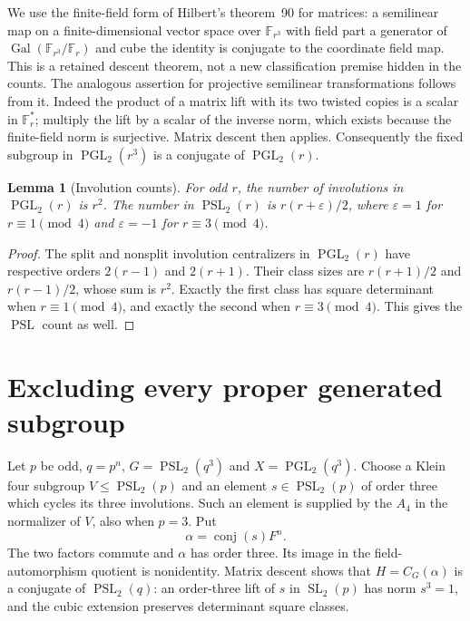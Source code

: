 \documentclass[11pt,a4paper]{article}
\newtheorem{lemma}{Lemma}
\newcommand{\PSL}{\operatorname{PSL}}
\newcommand{\PGL}{\operatorname{PGL}}
\begin{document}
We use the finite-field form of Hilbert's theorem~90 for matrices:
a semilinear map on a finite-dimensional vector space over
$\mathbb F_{r^3}$ with field part a generator of
$\operatorname{Gal}(\mathbb F_{r^3}/\mathbb F_r)$ and cube the
identity is conjugate to the coordinate field map. This is a retained
descent theorem, not a new classification premise hidden in the counts.
The analogous assertion for projective semilinear transformations follows
from it. Indeed the product of a matrix lift with its two twisted copies
is a scalar in $\mathbb F_r^*$; multiply the lift by a scalar of the
inverse norm, which exists because the finite-field norm is surjective.
Matrix descent then applies. Consequently the fixed subgroup in
$\PGL_2(r^3)$ is a conjugate of $\PGL_2(r)$.

\begin{lemma}[Involution counts]\label{counts}
For odd $r$, the number of involutions in $\PGL_2(r)$ is $r^2$.
The number in $\PSL_2(r)$ is $r(r+\varepsilon)/2$, where
$\varepsilon=1$ for $r\equiv1\pmod4$ and $\varepsilon=-1$
for $r\equiv3\pmod4$.
\end{lemma}
\begin{proof}
The split and nonsplit involution centralizers in $\PGL_2(r)$
have respective orders $2(r-1)$ and $2(r+1)$. Their class sizes
are $r(r+1)/2$ and $r(r-1)/2$, whose sum is $r^2$.
Exactly the first class has square determinant when $r\equiv1
\pmod4$, and exactly the second when $r\equiv3\pmod4$.
This gives the $\PSL$ count as well.
\end{proof}

\section{Excluding every proper generated subgroup}

Let $p$ be odd, $q=p^n$, $G=\PSL_2(q^3)$ and
$X=\PGL_2(q^3)$. Choose a Klein four subgroup
$V\leq\PSL_2(p)$ and an element $s\in\PSL_2(p)$ of order
three which cycles its three involutions. Such an element is supplied
by the $A_4$ in the normalizer of $V$, also when $p=3$.
Put
\[
                   \alpha=\operatorname{conj}(s)F^n.
\]
The two factors commute and $\alpha$ has order three. Its image
in the field-automorphism quotient is nonidentity. Matrix descent
shows that $H=C_G(\alpha)$ is a conjugate of $\PSL_2(q)$:
an order-three lift of $s$ in $\operatorname{SL}_2(p)$ has norm
$s^3=1$, and the cubic extension preserves determinant square classes.
\end{document}
